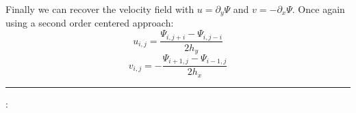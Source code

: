 Finally we can recover the velocity field with $u=\partial_y \Psi$ and $v=-\partial_x \Psi$.
Once again using a second order centered approach:
\[
u_{i,j} = \frac{\Psi_{i,j+i}-\Psi_{i,j-i}}{2 h_y}
\]
\[
v_{i,j} = - \frac{\Psi_{i+1,j}-\Psi_{i-1,j}}{2 h_x}
\]

\par\noindent\rule{\textwidth}{0.4pt}

\vspace{.5cm}

\begin{center}
\end{center}

\vspace{.5cm}

\Literature:\\


